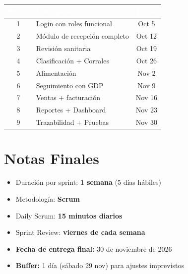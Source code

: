 \documentclass[11pt,a4paper]{article}
\begin{document}
\begin{center}
\begin{tabularx}{\textwidth}{|c|X|c|}
\hline
\rowcolor{verde}
\textcolor{white}{\textbf{Sprint}} & 
\textcolor{white}{\textbf{Entregable}} & 
\textcolor{white}{\textbf{Fecha}} \\
\hline
1 & Login con roles funcional & Oct 5 \\
\hline
2 & Módulo de recepción completo & Oct 12 \\
\hline
3 & Revisión sanitaria & Oct 19 \\
\hline
4 & Clasificación + Corrales & Oct 26 \\
\hline
5 & Alimentación & Nov 2 \\
\hline
6 & Seguimiento con GDP & Nov 9 \\
\hline
7 & Ventas + facturación & Nov 16 \\
\hline
8 & Reportes + Dashboard & Nov 23 \\
\hline
9 & Trazabilidad + Pruebas & Nov 30 \\
\hline
\end{tabularx}
\end{center}

\vspace{0.5cm}

\section*{Notas Finales}

\begin{itemize}
    \item Duración por sprint: \textbf{1 semana} (5 días hábiles)
    \item Metodología: \textbf{Scrum}
    \item Daily Scrum: \textbf{15 minutos diarios}
    \item Sprint Review: \textbf{viernes de cada semana}
    \item \textbf{Fecha de entrega final:} 30 de noviembre de 2026
    \item \textbf{Buffer:} 1 día (sábado 29 nov) para ajustes imprevistos
\end{itemize}
\end{document}
